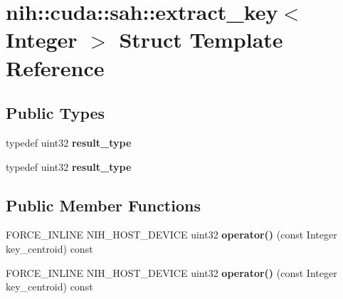 \hypertarget{structnih_1_1cuda_1_1sah_1_1extract__key}{
\section{nih\-:\-:cuda\-:\-:sah\-:\-:extract\-\_\-key$<$ \-Integer $>$ \-Struct \-Template \-Reference}
\label{structnih_1_1cuda_1_1sah_1_1extract__key}
}
\subsection*{\-Public \-Types}
\begin{DoxyCompactItemize}
\item 
\hypertarget{structnih_1_1cuda_1_1sah_1_1extract__key_afb8f74c21d9c8f8f9c665063fb6976bf}{
typedef uint32 {\bfseries result\-\_\-type}}
\label{structnih_1_1cuda_1_1sah_1_1extract__key_afb8f74c21d9c8f8f9c665063fb6976bf}

\item 
\hypertarget{structnih_1_1cuda_1_1sah_1_1extract__key_afb8f74c21d9c8f8f9c665063fb6976bf}{
typedef uint32 {\bfseries result\-\_\-type}}
\label{structnih_1_1cuda_1_1sah_1_1extract__key_afb8f74c21d9c8f8f9c665063fb6976bf}

\end{DoxyCompactItemize}
\subsection*{\-Public \-Member \-Functions}
\begin{DoxyCompactItemize}
\item 
\hypertarget{structnih_1_1cuda_1_1sah_1_1extract__key_a31ba7dacef71c78c8279d09400f6d19e}{
\-F\-O\-R\-C\-E\-\_\-\-I\-N\-L\-I\-N\-E \-N\-I\-H\-\_\-\-H\-O\-S\-T\-\_\-\-D\-E\-V\-I\-C\-E uint32 {\bfseries operator()} (const \-Integer key\-\_\-centroid) const }
\label{structnih_1_1cuda_1_1sah_1_1extract__key_a31ba7dacef71c78c8279d09400f6d19e}

\item 
\hypertarget{structnih_1_1cuda_1_1sah_1_1extract__key_a31ba7dacef71c78c8279d09400f6d19e}{
\-F\-O\-R\-C\-E\-\_\-\-I\-N\-L\-I\-N\-E \-N\-I\-H\-\_\-\-H\-O\-S\-T\-\_\-\-D\-E\-V\-I\-C\-E uint32 {\bfseries operator()} (const \-Integer key\-\_\-centroid) const }
\label{structnih_1_1cuda_1_1sah_1_1extract__key_a31ba7dacef71c78c8279d09400f6d19e}

\end{DoxyCompactItemize}
